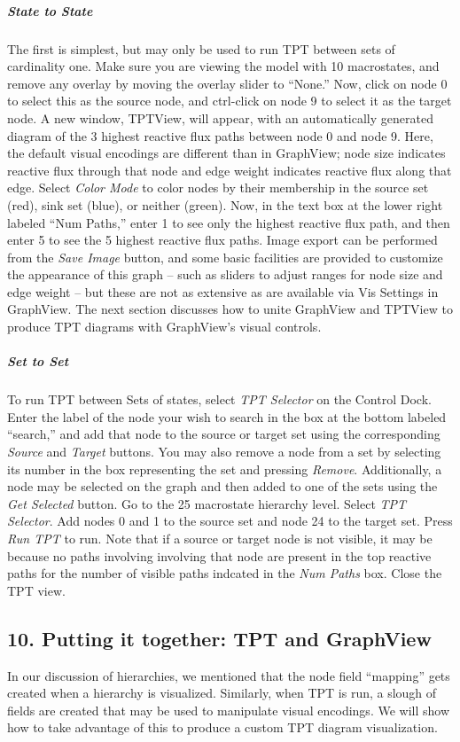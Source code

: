 \documentclass[10pt,a4paper]{report}
\begin{document}
\subparagraph*{State to State} 
The first is simplest, but may only be used to run TPT between sets of cardinality one. Make sure you are viewing the model with 10 macrostates, and remove any overlay by moving the overlay slider to ``None.'' Now, click on node 0 to select this as the source node, and ctrl-click on node 9 to select it as the target node. A new window, TPTView, will appear, with an automatically generated diagram of the 3 highest reactive flux paths between node 0 and node 9.  Here, the default visual encodings are different than in GraphView; node size indicates reactive flux through that node and edge weight indicates reactive flux along that edge. Select \emph{Color Mode} to color nodes by their membership in the source set (red), sink set (blue), or neither (green). Now, in the text box at the lower right labeled ``Num Paths,'' enter 1 to see only the highest reactive flux path, and then enter 5 to see the 5 highest reactive flux paths.  Image export can be performed from the \emph{Save Image} button, and some basic facilities are provided to customize the appearance of this graph -- such as sliders to adjust ranges for node size and edge weight -- but these are not as extensive as are available via Vis Settings in GraphView. The next section discusses how to unite GraphView and TPTView to produce TPT diagrams with GraphView's visual controls. 

\subparagraph*{Set to Set} 
To run TPT between Sets of states, select \emph{TPT Selector} on the Control Dock. Enter the label of the node your wish to search in the box at the bottom labeled ``search,'' and add that node to the source or target set using the corresponding \emph{Source} and \emph{Target} buttons. You may also remove a node from a set by selecting its number in the box representing the set and pressing \emph{Remove}. Additionally, a node may be selected on the graph and then added to one of the sets using the \emph{Get Selected} button. Go to the 25 macrostate hierarchy level. Select \emph{TPT Selector}. Add nodes 0 and 1 to the source set and node 24 to the target set. Press \emph{Run TPT} to run. Note that if a source or target node is not visible, it may be because no paths involving involving that node are present in the top reactive paths for the number of visible paths indcated in the \emph{Num Paths} box. Close the TPT view.

\subsection*{10. Putting it together: TPT and GraphView}
In our discussion of hierarchies, we mentioned that the node field ``mapping'' gets created when a hierarchy is visualized. Similarly, when TPT is run, a slough of fields are created that may be used to manipulate visual encodings. We will show how to take advantage of this to produce a custom TPT diagram visualization.
\end{document}
